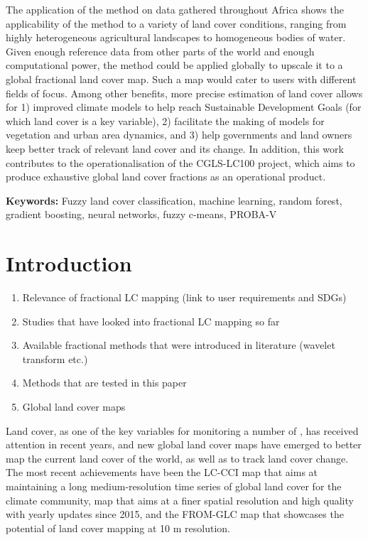 \documentclass[a4paper,10pt]{article}
\newcommand{\minisection}[1]{\medskip \textbf{#1:}}
\begin{document}
{The application of the method on data gathered throughout Africa shows the applicability of the method to a variety of land cover conditions, ranging from highly heterogeneous agricultural landscapes to homogeneous bodies of water. Given enough reference data from other parts of the world and enough computational power, the method could be applied globally to upscale it to a global fractional land cover map. Such a map would cater to users with different fields of focus. Among other benefits, more precise estimation of land cover allows for 1) improved climate models to help reach Sustainable Development Goals (for which land cover is a key variable), 2) facilitate the making of models for vegetation and urban area dynamics, and 3) help governments and land owners keep better track of relevant land cover and its change. In addition, this work contributes to the operationalisation of the CGLS-LC100 project, which aims to produce exhaustive global land cover fractions as an operational product.

\minisection{Keywords} Fuzzy land cover classification, machine learning, random forest, gradient boosting, neural networks, fuzzy c-means, PROBA-V
}

\section{Introduction}

\begin{enumerate}
 \item Relevance of fractional LC mapping (link to user requirements and SDGs)
 \item Studies that have looked into fractional LC mapping so far
 \item Available fractional methods that were introduced in literature (wavelet transform etc.)
 \item Methods that are tested in this paper
 \item Global land cover maps
\end{enumerate}

Land cover, as one of the key variables for monitoring a number of , has received attention in recent years, and new global land cover maps have emerged to better map the current land cover of the world, as well as to track land cover change.
The most recent achievements have been the \ac{LC-CCI} map  that aims at maintaining a long medium-resolution time series of global land cover for the climate community,  map that aims at a finer spatial resolution and high quality with yearly updates since 2015, and the \ac{FROM-GLC} map \citep{fromglc2019} that showcases the potential of land cover mapping at 10 m resolution.
\end{document}
